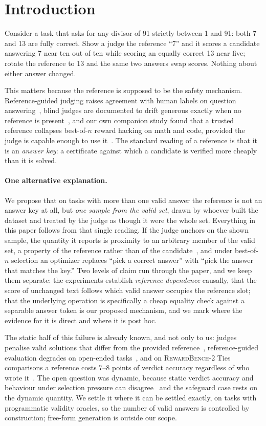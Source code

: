 \documentclass[11pt]{article}
\begin{document}
\section{Introduction}

Consider a task that asks for any divisor of 91 strictly between 1 and 91: both 7 and 13 are fully correct.
Show a judge the reference ``7'' and it scores a candidate answering 7 near ten out of ten while scoring an equally correct 13 near five; rotate the reference to 13 and the same two answers swap scores.
Nothing about either answer changed.

This matters because the reference is supposed to be the safety mechanism.
Reference-guided judging raises agreement with human labels on question answering~\cite{refguided2024}, blind judges are documented to drift generous exactly when no reference is present~\cite{generous2026}, and our own companion study found that a trusted reference collapses best-of-$n$ reward hacking on math and code, provided the judge is capable enough to use it~\cite{companionA}.
The standard reading of a reference is that it is an \emph{answer key}: a certificate against which a candidate is verified more cheaply than it is solved.

\paragraph{One alternative explanation.}
We propose that on tasks with more than one valid answer the reference is not an answer key at all, but \emph{one sample from the valid set}, drawn by whoever built the dataset and treated by the judge as though it were the whole set.
Everything in this paper follows from that single reading.
If the judge anchors on the shown sample, the quantity it reports is proximity to an arbitrary member of the valid set, a property of the reference rather than of the candidate~\cite{companionB}, and under best-of-$n$ selection an optimizer replaces ``pick a correct answer'' with ``pick the answer that matches the key.''
Two levels of claim run through the paper, and we keep them separate: the experiments establish \emph{reference dependence} causally, that the score of unchanged text follows which valid answer occupies the reference slot; that the underlying operation is specifically a cheap equality check against a separable answer token is our proposed mechanism, and we mark where the evidence for it is direct and where it is post hoc.

The static half of this failure is already known, and not only to us: judges penalise valid solutions that differ from the provided reference~\cite{fixation2025}, reference-guided evaluation degrades on open-ended tasks~\cite{judgingref2026}, and on \textsc{RewardBench-2} Ties comparisons a reference costs $7$--$8$ points of verdict accuracy regardless of who wrote it~\cite{companionA,malik2025rewardbench2}.
The open question was dynamic, because static verdict accuracy and behaviour under selection pressure can disagree~\cite{gao2022scaling} and the safeguard case rests on the dynamic quantity.
We settle it where it can be settled exactly, on tasks with programmatic validity oracles, so the number of valid answers is controlled by construction; free-form generation is outside our scope.
\end{document}
